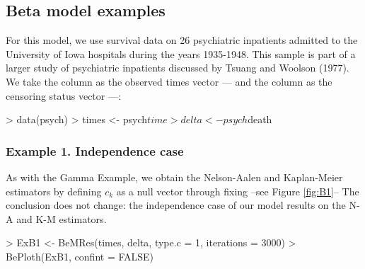 \documentclass[letterpaper]{article}
\begin{document}

\subsection{Beta model examples}
For this model, we use survival data on 26 psychiatric inpatients admitted to the University of Iowa hospitals during the years 1935-1948. This sample is part of a larger study of psychiatric inpatients discussed by Tsuang and Woolson (1977). We take the  column as the observed times vector ---- and the  column as the censoring status vector ----:

\begin{Schunk}
\begin{Sinput}
> data(psych)
> times <- psych$time
> delta <- psych$death
\end{Sinput}
\end{Schunk}

\subsubsection{Example 1. Independence case}

As with the Gamma Example, we obtain the Nelson-Aalen and Kaplan-Meier estimators by defining $c_k$ as a null vector through fixing  --see Figure \ref{fig:B1}-- The conclusion does not change: the independence case of our model results on the N-A and K-M estimators.

\begin{Schunk}
\begin{Sinput}
> ExB1 <- BeMRes(times, delta, type.c = 1, iterations = 3000)
> BePloth(ExB1, confint = FALSE)
\end{Sinput}
\end{Schunk}
\end{document}
